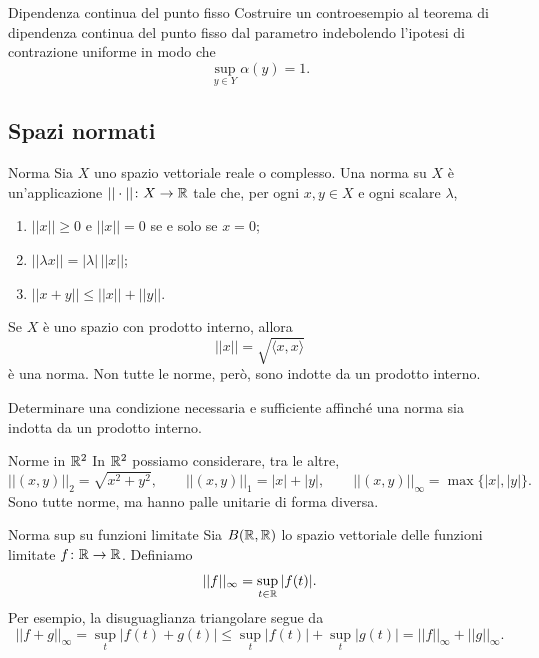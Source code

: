 \documentclass[a4paper]{article}
\begin{document}
\begin{snippetexercise}{Dipendenza continua del punto fisso}
    Costruire un controesempio al teorema di dipendenza continua del punto fisso dal parametro
    indebolendo l'ipotesi di contrazione uniforme in modo che
    \[
        \sup_{y\in Y}\alpha(y)=1.
    \]
\end{snippetexercise}

\subsection{Spazi normati}

\begin{snippetdefinition}{Norma}
    Sia \(X\) uno spazio vettoriale reale o complesso.
    Una norma su \(X\) è un'applicazione \(||\cdot||\colon X\to\mathbb{R}\) tale che,
    per ogni \(x,y\in X\) e ogni scalare \(\lambda\),
    \begin{enumerate}
        \item \(||x||\geq0\) e \(||x||=0\) se e solo se \(x=0\);
        \item \(||\lambda x||=|\lambda|\,||x||\);
        \item \(||x+y||\leq||x||+||y||\).
    \end{enumerate}
\end{snippetdefinition}

Se \(X\) è uno spazio con prodotto interno, allora
\[
    ||x||=\sqrt{\langle x,x\rangle}
\]
è una norma. Non tutte le norme, però, sono indotte da un prodotto interno.

\begin{snippetexercise}{}
    Determinare una condizione necessaria e sufficiente affinché una norma sia indotta
    da un prodotto interno.
\end{snippetexercise}

\begin{snippetexample}{Norme in \(\mathbb{R}^2\)}
    In \(\mathbb{R}^2\) possiamo considerare, tra le altre,
    \[
        ||(x,y)||_2=\sqrt{x^2+y^2},
        \qquad
        ||(x,y)||_1=|x|+|y|,
        \qquad
        ||(x,y)||_\infty=\max\{|x|,|y|\}.
    \]
    Sono tutte norme, ma hanno palle unitarie di forma diversa.
\end{snippetexample}

\begin{snippetexample}{Norma sup su funzioni limitate}
    Sia \(B(\mathbb{R},\mathbb{R})\) lo spazio vettoriale delle funzioni limitate
    \(f\colon\mathbb{R}\to\mathbb{R}\). Definiamo
    \[
        ||f||_\infty=\sup_{t\in\mathbb{R}}|f(t)|.
    \]
    Per esempio, la disuguaglianza triangolare segue da
    \[
        ||f+g||_\infty
        =\sup_t|f(t)+g(t)|
        \leq \sup_t|f(t)|+\sup_t|g(t)|
        =||f||_\infty+||g||_\infty.
    \]
\end{snippetexample}
\end{document}
